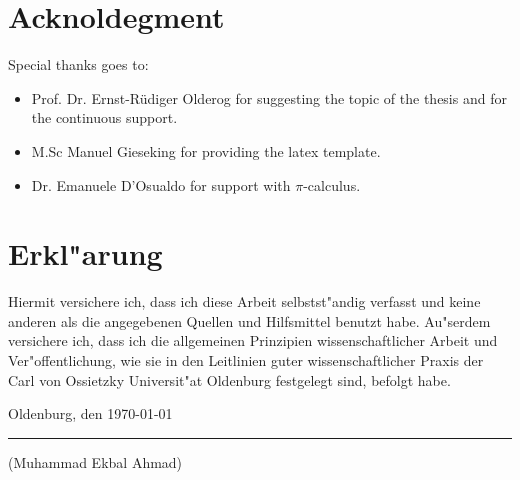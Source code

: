 	\section*{Acknoldegment}
	Special thanks goes to:
	\begin{itemize}
	\item Prof. Dr. Ernst-Rüdiger Olderog for suggesting the topic of the thesis and for the continuous support.
	\item M.Sc Manuel Gieseking for providing the latex template.
	\item Dr. Emanuele D'Osualdo for support with $\pi$-calculus.
	\end{itemize}
	\section*{Erkl"arung}
	Hiermit versichere ich, dass ich diese Arbeit selbstst"andig verfasst und keine anderen als die angegebenen Quellen und Hilfsmittel benutzt habe. Au"serdem versichere ich, dass ich die allgemeinen Prinzipien wissenschaftlicher Arbeit und Ver"offentlichung, wie sie in den Leitlinien guter wissenschaftlicher Praxis der Carl von Ossietzky Universit"at Oldenburg festgelegt sind, befolgt habe.
	
	\vspace{1cm}
	Oldenburg, den \today
	
	\vspace{0.5cm}
	\rule{6cm}{0.5pt}
	
	(Muhammad Ekbal Ahmad)


